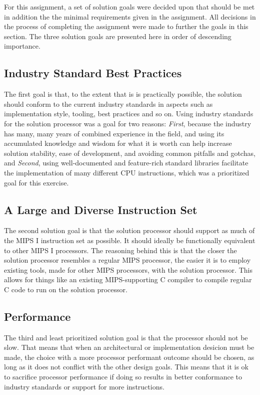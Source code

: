 For this assignment, a set of solution goals were decided upon that should be met in addition the the minimal requirements given in the assignment.
All decisions in the process of completing the assignment were made to further the goals in this section.
The three solution goals are presented here in order of descending importance.

\subsection{Industry Standard Best Practices}

The first goal is that, to the extent that is is practically possible, the solution should conform to the current industry standards in aspects such as implementation style, tooling, best practices and so on.
Using industry standards for the solution processor was a goal for two reasons:
\textit{First}, because the industry has many, many years of combined experience in the field, and using its accumulated knowledge and wisdom for what it is worth can help increase solution stability, ease of development, and avoiding common pitfalls and gotchas, and
\textit{Second}, using well-documented and feature-rich standard libraries facilitate the implementation of many different CPU instructions, which was a prioritized goal for this exercise.

\subsection{A Large and Diverse Instruction Set}

The second solution goal is that the solution processor should support as much of the MIPS I instruction set as possible.
It should ideally be functionally equivalent to other MIPS I processors.
The reasoning behind this is that the closer the solution processor resembles a regular MIPS processor, the easier it is to employ existing tools, made for other MIPS processors, with the solution processor.
This allows for things like an existing MIPS-supporting C compiler to compile regular C code to run on the solution processor.

\subsection{Performance}

The third and least prioritized solution goal is that the processor should not be slow.
That means that when an architectural or implementation desicion must be made, the choice with a more processor performant outcome should be chosen, as long as it does not conflict with the other design goals.
This means that it is ok to sacrifice processor performance if doing so results in better conformance to industry standards or support for more instructions.

